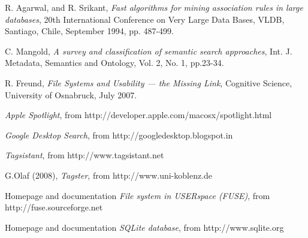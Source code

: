 \begin{thebibliography}{99}
R. Agarwal, and R. Srikant, 
\emph{Fast algorithms for mining association rules in large databases},
20th International Conference on Very Large Data Bases, VLDB, Santiago, Chile, September 1994, pp. 487-499.

C. Mangold, \emph{A survey and classification of semantic search approaches}, 
Int. J. Metadata, Semantics and Ontology, Vol. 2, No. 1, pp.23-34.

R. Freund, 
\emph{File Systems and Usability — the Missing Link},
Cognitive Science, University of Osnabruck, July 2007.


\emph{Apple Spotlight}, from http://developer.apple.com/macosx/spotlight.html

\emph{Google Desktop Search}, from http://googledesktop.blogspot.in

\emph{Tagsistant}, from http://www.tagsistant.net

G.Olaf (2008), \emph{Tagster}, from http://www.uni-koblenz.de

Homepage and documentation \emph{File system in USERspace (FUSE)}, from http://fuse.sourceforge.net

Homepage and documentation \emph{SQLite database}, from http://www.sqlite.org

\end{thebibliography}
